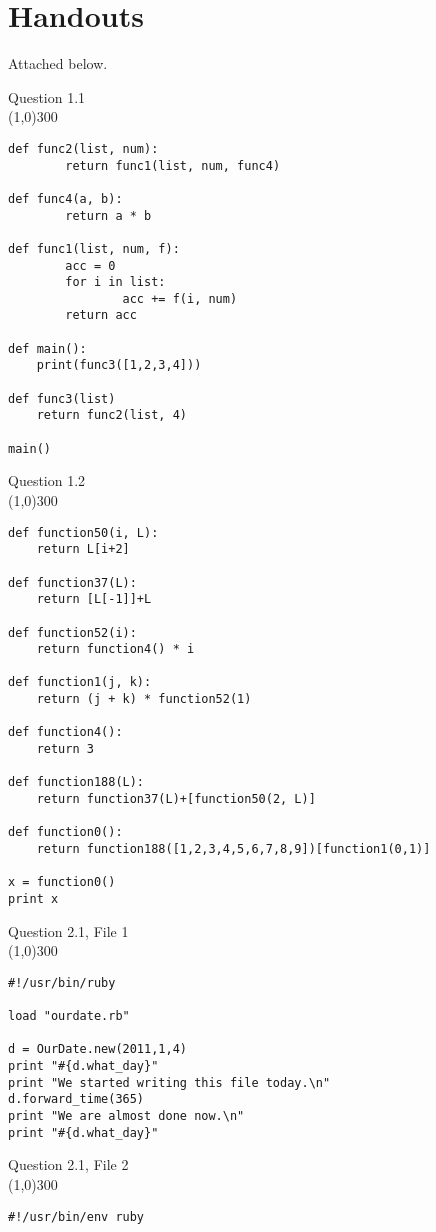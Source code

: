 \documentclass{article}
\begin{document}
\section{Handouts}
Attached below.
\newpage
{\Large
Question 1.1 \\
\line(1,0){300}
\begin{verbatim}
def func2(list, num):
        return func1(list, num, func4)

def func4(a, b):
        return a * b

def func1(list, num, f):
        acc = 0
        for i in list:
                acc += f(i, num)
        return acc

def main():
    print(func3([1,2,3,4]))

def func3(list)
    return func2(list, 4)

main()

\end{verbatim}
\newpage
Question 1.2 \\
\line(1,0){300}
\begin{verbatim}
def function50(i, L):
    return L[i+2]

def function37(L):
    return [L[-1]]+L

def function52(i):
    return function4() * i

def function1(j, k):
    return (j + k) * function52(1)

def function4():
    return 3

def function188(L):
    return function37(L)+[function50(2, L)]

def function0():
    return function188([1,2,3,4,5,6,7,8,9])[function1(0,1)]

x = function0()
print x

\end{verbatim}

\newpage
Question 2.1, File 1 \\
\line(1,0){300}
\begin{verbatim}
#!/usr/bin/ruby

load "ourdate.rb"

d = OurDate.new(2011,1,4)
print "#{d.what_day}"
print "We started writing this file today.\n"
d.forward_time(365)
print "We are almost done now.\n"
print "#{d.what_day}"

\end{verbatim}
\newpage
Question 2.1, File 2 \\
\line(1,0){300}
\begin{verbatim}
#!/usr/bin/env ruby


\end{verbatim}}
\end{document}
